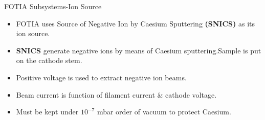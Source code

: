 \documentclass[11pt]{beamer}
\begin{document}
\begin{frame}{FOTIA Subsystems-Ion Source}
   
  \begin{itemize}
   
    \item FOTIA uses Source of Negative Ion by Caesium Sputtering \textbf{(SNICS)} as its ion source.\\
    
   		
    \item \textbf{SNICS} generate negative ions by means of Caesium sputtering.Sample is put on the cathode stem.
    
    \item Positive voltage is used to extract negative ion beams.
    \item Beam current is function of filament current \& cathode voltage.
    \item Must be kept under $10^{-7}$ mbar order of vacuum to protect Caesium.
   
   \end{itemize}

\end{frame}
\end{document}
